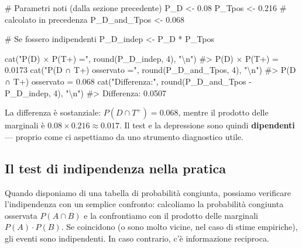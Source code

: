 \documentclass[
  italian,
  letterpaper,
  a4paper,
  11pt,
  open=any]{scrbook}
\newenvironment{Shaded}{\begin{snugshade}}{\end{snugshade}}
\newcommand{\CommentTok}[1]{\textcolor[rgb]{0.37,0.37,0.37}{#1}}
\newcommand{\DecValTok}[1]{\textcolor[rgb]{0.68,0.00,0.00}{#1}}
\newcommand{\FloatTok}[1]{\textcolor[rgb]{0.68,0.00,0.00}{#1}}
\newcommand{\FunctionTok}[1]{\textcolor[rgb]{0.28,0.35,0.67}{#1}}
\newcommand{\NormalTok}[1]{\textcolor[rgb]{0.00,0.23,0.31}{#1}}
\newcommand{\OtherTok}[1]{\textcolor[rgb]{0.00,0.23,0.31}{#1}}
\newcommand{\SpecialCharTok}[1]{\textcolor[rgb]{0.37,0.37,0.37}{#1}}
\newcommand{\StringTok}[1]{\textcolor[rgb]{0.13,0.47,0.30}{#1}}
\theoremstyle{plain}
\theoremstyle{definition}
\theoremstyle{definition}
\theoremstyle{remark}
\begin{document}
\begin{Shaded}
\begin{Highlighting}[]
\CommentTok{\# Parametri noti (dalla sezione precedente)}
\NormalTok{P\_D }\OtherTok{\textless{}{-}} \FloatTok{0.08}
\NormalTok{P\_Tpos }\OtherTok{\textless{}{-}} \FloatTok{0.216}   \CommentTok{\# calcolato in precedenza}
\NormalTok{P\_D\_and\_Tpos }\OtherTok{\textless{}{-}} \FloatTok{0.068}

\CommentTok{\# Se fossero indipendenti}
\NormalTok{P\_D\_indep }\OtherTok{\textless{}{-}}\NormalTok{ P\_D }\SpecialCharTok{*}\NormalTok{ P\_Tpos}

\FunctionTok{cat}\NormalTok{(}\StringTok{"P(D) × P(T+) ="}\NormalTok{, }\FunctionTok{round}\NormalTok{(P\_D\_indep, }\DecValTok{4}\NormalTok{), }\StringTok{"}\SpecialCharTok{\textbackslash{}n}\StringTok{"}\NormalTok{)}
\CommentTok{\#\textgreater{} P(D) × P(T+) = 0.0173}
\FunctionTok{cat}\NormalTok{(}\StringTok{"P(D ∩ T+) osservato ="}\NormalTok{, }\FunctionTok{round}\NormalTok{(P\_D\_and\_Tpos, }\DecValTok{4}\NormalTok{), }\StringTok{"}\SpecialCharTok{\textbackslash{}n}\StringTok{"}\NormalTok{)}
\CommentTok{\#\textgreater{} P(D ∩ T+) osservato = 0.068}
\FunctionTok{cat}\NormalTok{(}\StringTok{"Differenza:"}\NormalTok{, }\FunctionTok{round}\NormalTok{(P\_D\_and\_Tpos }\SpecialCharTok{{-}}\NormalTok{ P\_D\_indep, }\DecValTok{4}\NormalTok{), }\StringTok{"}\SpecialCharTok{\textbackslash{}n}\StringTok{"}\NormalTok{)}
\CommentTok{\#\textgreater{} Differenza: 0.0507}
\end{Highlighting}
\end{Shaded}

La differenza è sostanziale: \(P(D \cap T^+) = 0.068\), mentre il
prodotto delle marginali è \(0.08 \times 0.216 \approx 0.017\). Il test
e la depressione sono quindi \textbf{dipendenti} --- proprio come ci
aspettiamo da uno strumento diagnostico utile.

\subsection{Il test di indipendenza nella
pratica}\label{il-test-di-indipendenza-nella-pratica}

Quando disponiamo di una tabella di probabilità congiunta, possiamo
verificare l'indipendenza con un semplice confronto: calcoliamo la
probabilità congiunta osservata \(P(A \cap B)\) e la confrontiamo con il
prodotto delle marginali \(P(A) \cdot P(B)\). Se coincidono (o sono
molto vicine, nel caso di stime empiriche), gli eventi sono
indipendenti. In caso contrario, c'è informazione reciproca.
\end{document}
